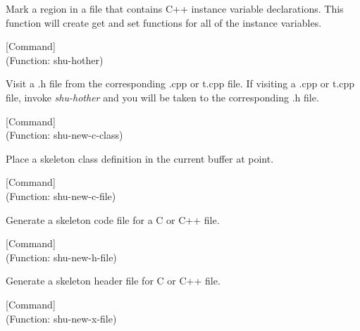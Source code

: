 \begin{doc-string}
Mark a region in a file that contains C++ instance variable declarations.
This function will create get and set functions for all of the instance
variables.
\end{doc-string}

\vspace{1em}
\noindent
{}
\usebox{\funcname}
 \hfill [Command]\\%
 (Function: shu-hother)

\begin{doc-string}
Visit a .h file from the corresponding .cpp or t.cpp file.  If visiting a .cpp or
t.cpp file, invoke \emph{shu-hother} and you will be taken to the corresponding .h file.
\end{doc-string}

\vspace{1em}
\noindent
{}
\usebox{\funcname}
 \hfill [Command]\\%
 (Function: shu-new-c-class)

\begin{doc-string}
Place a skeleton class definition in the current buffer at point.
\end{doc-string}

\vspace{1em}
\noindent
{}
\usebox{\funcname}
 \hfill [Command]\\%
 (Function: shu-new-c-file)

\begin{doc-string}
Generate a skeleton code file for a C or C++ file.
\end{doc-string}

\vspace{1em}
\noindent
{}
\usebox{\funcname}
 \hfill [Command]\\%
 (Function: shu-new-h-file)

\begin{doc-string}
Generate a skeleton header file for C or C++ file.
\end{doc-string}

\vspace{1em}
\noindent
{}
\usebox{\funcname}
 \hfill [Command]\\%
 (Function: shu-new-x-file)

